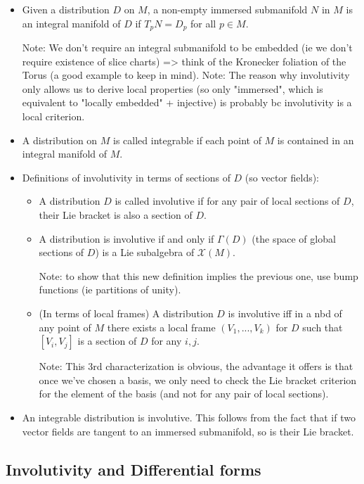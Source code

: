 \documentclass{report}
\theoremstyle{definition}
\begin{document}
\begin{itemize}
    \item Given a distribution $D$ on $M$, a non-empty immersed submanifold $N$ in $M$ is an integral manifold of $D$ if $T_pN=D_p$ for all $p\in M$.

    Note: We don't require an integral submanifold to be embedded (ie we don't require existence of slice charts) => think of the Kronecker foliation of the Torus (a good example to keep in mind).
    Note: The reason why involutivity only allows us to derive local properties (so only "immersed", which is equivalent to "locally embedded" + injective) is probably bc involutivity is a local criterion.
    \item A distribution on $M$ is called integrable if each point of $M$ is contained in an integral manifold of $M$.
    \item Definitions of involutivity in terms of sections of $D$ (so vector fields):
    \begin{itemize}
        \item A distribution $D$ is called involutive if for any pair of local sections of $D$, their Lie bracket is also a section of $D$.
        \item A distribution is involutive if and only if $\Gamma(D)$ (the space of global sections of $D$) is a Lie subalgebra of $\mathcal{X}(M)$.

        Note: to show that this new definition implies the previous one, use bump functions (ie partitions of unity).
        \item (In terms of local frames) A distribution $D$ is involutive iff in a nbd of any point of $M$ there exists a local frame $(V_1,...,V_k)$ for $D$ such that $[V_i,V_j]$ is a section of $D$ for any $i,j$.

        Note: This 3rd characterization is obvious, the advantage it offers is that once we've chosen a basis, we only need to check the Lie bracket criterion for the element of the basis (and not for any pair of local sections).
    \end{itemize}
    \item An integrable distribution is involutive. This follows from the fact that if two vector fields are tangent to an immersed submanifold, so is their Lie bracket.
\end{itemize}

\subsection{Involutivity and Differential forms}
\end{document}
